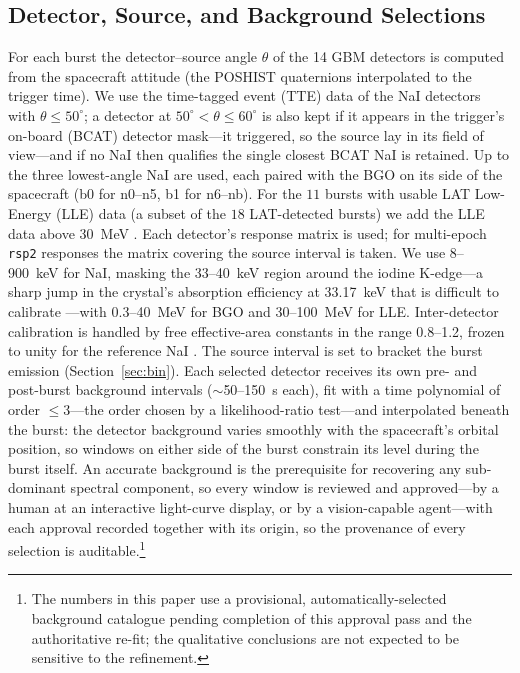 \subsection{Detector, Source, and Background Selections} \label{sec:bkg}
For each burst the detector--source angle $\theta$ of the 14 GBM detectors is
computed from the spacecraft attitude (the POSHIST quaternions interpolated to
the trigger time). We use the time-tagged event (TTE) data of the NaI detectors
with $\theta\le50^\circ$; a detector at $50^\circ<\theta\le60^\circ$ is also kept
if it appears in the trigger's on-board (BCAT) detector mask---it triggered, so
the source lay in its field of view---and if no NaI then qualifies the single
closest BCAT NaI is retained. Up to the three lowest-angle NaI are used, each
paired with the BGO on its side of the spacecraft (b0 for n0--n5, b1 for
n6--nb). For the $11$ bursts with usable LAT Low-Energy (LLE) data (a subset of
the $18$ LAT-detected bursts) we add the LLE data above 30~MeV
\citep{Atwood2009}. Each detector's response matrix is used; for multi-epoch
\texttt{rsp2} responses the matrix covering the source interval is taken. We use 8--900~keV for NaI, masking the 33--40~keV region around the iodine
K-edge---a sharp jump in the crystal's absorption efficiency at 33.17~keV
that is difficult to calibrate \citep{Ronchi2020}---with 0.3--40~MeV for BGO
and 30--100~MeV for LLE. Inter-detector calibration is handled by free
effective-area constants in the range 0.8--1.2, frozen to unity for the
reference NaI \citep[as in][]{Ronchi2020}. The source interval is set to bracket the burst emission
(Section~\ref{sec:bin}). Each selected detector receives its own pre- and
post-burst background intervals ($\sim$50--150~s each), fit with a time
polynomial of order $\le$3---the order chosen by a likelihood-ratio test---and
interpolated beneath the burst: the detector background varies smoothly with the
spacecraft's orbital position, so windows on either side of the burst constrain
its level during the burst itself. An accurate background is the prerequisite
for recovering any sub-dominant spectral component, so every window is reviewed
and approved---by a human at an interactive light-curve display, or by a
vision-capable agent---with each approval recorded together with its origin, so
the provenance of every selection is auditable.\footnote{The numbers in this
paper use a provisional, automatically-selected background catalogue pending
completion of this approval pass and the authoritative re-fit; the qualitative
conclusions are not expected to be sensitive to the refinement.}

